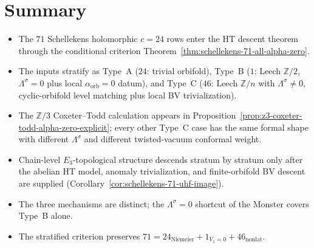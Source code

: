 \section{Summary}
\label{sec:schellekens-71-summary}

\begin{itemize}
\item The $71$ Schellekens holomorphic $c = 24$ rows enter the HT
descent theorem through the conditional criterion
Theorem~\ref{thm:schellekens-71-all-alpha-zero}.
\item The inputs stratify as Type~A ($24$: trivial orbifold),
Type~B ($1$: Leech $\mathbb{Z}/2$, $\Lambda^\sigma = 0$ plus
local $\alpha_{\mathrm{orb}}=0$ datum), and Type~C ($46$: Leech
$\mathbb{Z}/n$ with $\Lambda^\sigma \ne 0$, cyclic-orbifold level
matching plus local BV trivialization).
\item The $\mathbb{Z}/3$ Coxeter--Todd calculation appears in
Proposition~\ref{prop:z3-coxeter-todd-alpha-zero-explicit}; every
other Type~C case has the same formal shape with different
$\Lambda^\sigma$ and different twisted-vacuum conformal weight.
\item Chain-level $E_3$-topological structure descends stratum by
stratum only after the abelian HT model, anomaly trivialization, and
finite-orbifold BV descent are supplied
(Corollary~\ref{cor:schellekens-71-uhf-image}).
\item The three mechanisms are distinct; the
$\Lambda^\sigma = 0$ shortcut of the Monster covers Type~B alone.
\item The stratified criterion preserves
$71 = 24_{\mathrm{Niemeier}} + 1_{V_1=0} + 46_{\mathrm{nonlat}}$.
\end{itemize}
